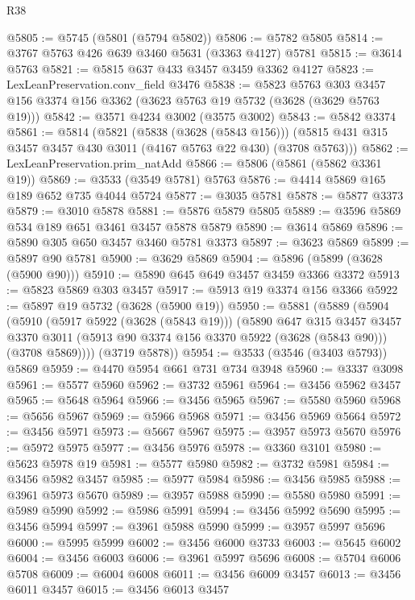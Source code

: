 \begin{lexlean}{R38}
\begin{coremodule}
@5805 := @5745 (@5801 (@5794 @5802))
@5806 := @5782 @5805
@5814 := @3767 @5763 @426 @639 @3460 @5631 (@3363 @4127) @5781
@5815 := @3614 @5763
@5821 := @5815 @637 @433 @3457 @3459 @3362 @4127
@5823 := LexLeanPreservation.conv_field @3476
@5838 := @5823
    @5763
    @303
    @3457
    @156
    @3374
    @156
    @3362
    (@3623 @5763 @19 @5732 (@3628 (@3629 @5763 @19)))
@5842 := @3571 @4234 @3002 (@3575 @3002)
@5843 := @5842 @3374
@5861 := @5814
    (@5821
      (@5838 (@3628 (@5843 @156)))
      (@5815 @431 @315 @3457 @3457 @430 @3011 (@4167 @5763 @22 @430) (@3708 @5763)))
@5862 := LexLeanPreservation.prim_natAdd
@5866 := @5806 (@5861 (@5862 @3361 @19))
@5869 := @3533 (@3549 @5781) @5763
@5876 := @4414 @5869 @165 @189 @652 @735 @4044 @5724
@5877 := @3035 @5781
@5878 := @5877 @3373
@5879 := @3010 @5878
@5881 := @5876 @5879 @5805
@5889 := @3596 @5869 @534 @189 @651 @3461 @3457 @5878 @5879
@5890 := @3614 @5869
@5896 := @5890 @305 @650 @3457 @3460 @5781 @3373
@5897 := @3623 @5869
@5899 := @5897 @90 @5781
@5900 := @3629 @5869
@5904 := @5896 (@5899 (@3628 (@5900 @90)))
@5910 := @5890 @645 @649 @3457 @3459 @3366 @3372
@5913 := @5823 @5869 @303 @3457
@5917 := @5913 @19 @3374 @156 @3366
@5922 := @5897 @19 @5732 (@3628 (@5900 @19))
@5950 := @5881
    (@5889
      (@5904
        (@5910
          (@5917 @5922 (@3628 (@5843 @19)))
          (@5890
            @647
            @315
            @3457
            @3457
            @3370
            @3011
            (@5913 @90 @3374 @156 @3370 @5922 (@3628 (@5843 @90)))
            (@3708 @5869))))
      (@3719 @5878))
@5954 := @3533 (@3546 (@3403 @5793)) @5869
@5959 := @4470 @5954 @661 @731 @734 @3948
@5960 := @3337 @3098
@5961 := @5577 @5960
@5962 := @3732 @5961
@5964 := @3456 @5962 @3457
@5965 := @5648 @5964
@5966 := @3456 @5965
@5967 := @5580 @5960
@5968 := @5656 @5967
@5969 := @5966 @5968
@5971 := @3456 @5969 @5664
@5972 := @3456 @5971
@5973 := @5667 @5967
@5975 := @3957 @5973 @5670
@5976 := @5972 @5975
@5977 := @3456 @5976
@5978 := @3360 @3101
@5980 := @5623 @5978 @19
@5981 := @5577 @5980
@5982 := @3732 @5981
@5984 := @3456 @5982 @3457
@5985 := @5977 @5984
@5986 := @3456 @5985
@5988 := @3961 @5973 @5670
@5989 := @3957 @5988
@5990 := @5580 @5980
@5991 := @5989 @5990
@5992 := @5986 @5991
@5994 := @3456 @5992 @5690
@5995 := @3456 @5994
@5997 := @3961 @5988 @5990
@5999 := @3957 @5997 @5696
@6000 := @5995 @5999
@6002 := @3456 @6000 @3733
@6003 := @5645 @6002
@6004 := @3456 @6003
@6006 := @3961 @5997 @5696
@6008 := @5704 @6006 @5708
@6009 := @6004 @6008
@6011 := @3456 @6009 @3457
@6013 := @3456 @6011 @3457
@6015 := @3456 @6013 @3457

\end{coremodule}
\end{lexlean}
